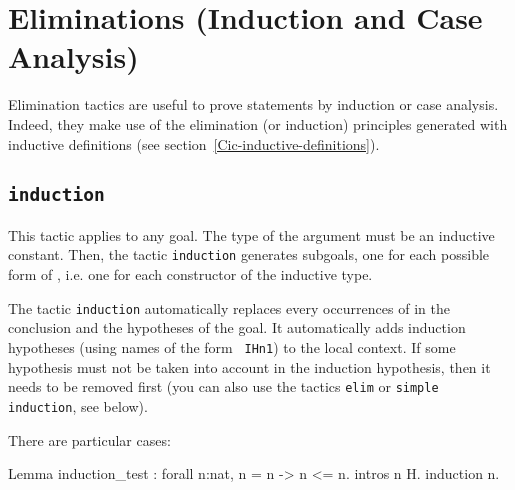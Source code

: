 \section{Eliminations (Induction and Case Analysis)}

Elimination tactics are useful to prove statements by induction or
case analysis.  Indeed, they make use of the elimination (or
induction) principles generated with inductive definitions (see
section~\ref{Cic-inductive-definitions}).

\subsection{\tt induction \term}

This tactic applies to any goal. The type of the argument {\term} must
be an inductive constant. Then, the tactic {\tt induction}
generates subgoals, one for each possible form of {\term}, i.e. one
for each constructor of the inductive type.

The tactic {\tt induction} automatically replaces every occurrences
of {\term} in the conclusion and the hypotheses of the goal.  It
automatically adds induction hypotheses (using names of the form {\tt
  IHn1}) to the local context. If some hypothesis must not be taken
into account in the induction hypothesis, then it needs to be removed
first (you can also use the tactics {\tt elim} or {\tt simple induction},
see below).

There are particular cases:


\begin{coq_example}
Lemma induction_test : forall n:nat, n = n -> n <= n.
intros n H.
induction n.
\end{coq_example}

